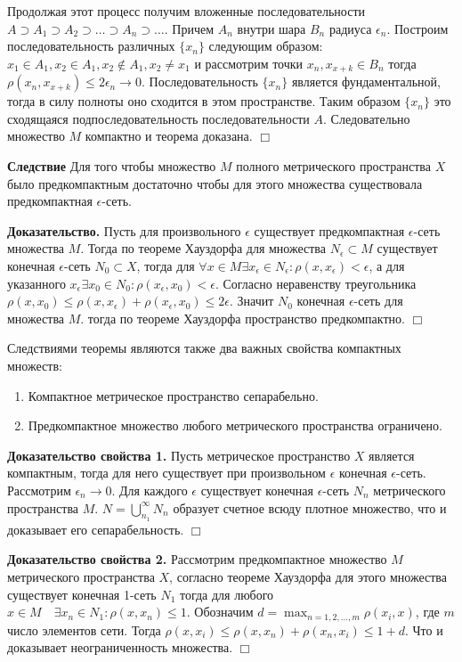 \documentclass[12pt]{report}
\newcommand{\be}{\begin{enumerate}}
\newcommand{\ee}{\end{enumerate}}
\renewcommand{\[}{$\\\displaystyle}
\renewcommand{\]}{\\$}
\renewcommand{\[}{$\\\displaystyle}
\newcommand{\btev}[1][]{\textbf{Доказательство#1.}
}
\newcommand{\etev}{$\Box$}
\begin{document}
  Продолжая этот процесс получим вложенные последовательности $A\supset A_1\supset A_2\supset \dots\supset A_n\supset \dots$. Причем $A_n$ внутри шара $B_n$ радиуса $\epsilon_n$. Построим последовательность различных $\{x_n\}$ следующим образом: $x_1 \in A_1, x_2 \in A_1, x_2 \not\in A_1, x_2 \neq x_1$ и рассмотрим точки $x_n, x_{x+k} \in B_n$ тогда $\rho(x_n,x_{x+k})\leq 2 \epsilon_n \rightarrow 0$. Последовательность $\{x_n\}$ является фундаментальной, тогда в силу полноты оно сходится в этом пространстве. Таким образом $\{x_n\}$ это сходящаяся подпоследовательность последовательности $A$. Следовательно множество $M$ компактно и теорема доказана.
\etev

\textbf{Следствие} Для того чтобы множество $M$ полного метрического пространства $X$ было предкомпактным достаточно чтобы для этого множества существовала предкомпактная $\epsilon$-сеть.

\btev[] Пусть для произвольного $\epsilon$ существует предкомпактная $\epsilon$-сеть множества $M$. Тогда по теореме Хауздорфа для множества $N_\epsilon \subset M$ существует конечная $\epsilon$-сеть $N_0 \subset X$, тогда для $\forall x \in M \exists x_\epsilon \in N_\epsilon: \rho(x,x_\epsilon) < \epsilon$, а для указанного $x_\epsilon \exists x_0\in N_0: \rho(x_\epsilon,x_0)<\epsilon$. Согласно неравенству треугольника $\rho(x,x_0)\leq \rho(x,x_\epsilon) + \rho(x_\epsilon,x_0) \leq 2\epsilon$. Значит $N_0$ конечная $\epsilon$-сеть для множества $M$. тогда по теореме Хауздорфа пространство предкомпактно. \etev

Следствиями теоремы являются также два важных свойства компактных множеств:

\be
  \item Компактное метрическое пространство сепарабельно.
  \item Предкомпактное множество любого метрического пространства ограничено.
\ee

\btev[ свойства 1] Пусть метрическое пространство $X$ является компактным, тогда для него существует при произвольном $\epsilon$ конечная $\epsilon$-сеть. Рассмотрим $\epsilon_n \rightarrow 0$. Для каждого $\epsilon$ существует конечная $\epsilon$-сеть $N_n$ метрического пространства $M$. $N=\bigcup _{n_1}^{\infty} N_n$ образует счетное всюду плотное множество, что и доказывает его сепарабельность. \etev

\btev[ свойства 2] Рассмотрим предкомпактное множество $M$ метрического пространства $X$, согласно теореме Хауздорфа для этого множества существует конечная 1-сеть $N_1$ тогда для любого $x \in M\quad \exists x_n \in N_1: \rho(x, x_n) \leq 1$. Обозначим $d=\max_{n=1,2,\dots,m}\rho(x_i,x)$, где $m$ число элементов сети. Тогда $\rho(x, x_i) \leq \rho(x, x_n)+\rho(x_n, x_i) \leq 1+d$. Что и доказывает неограниченность множества. \etev
\end{document}
